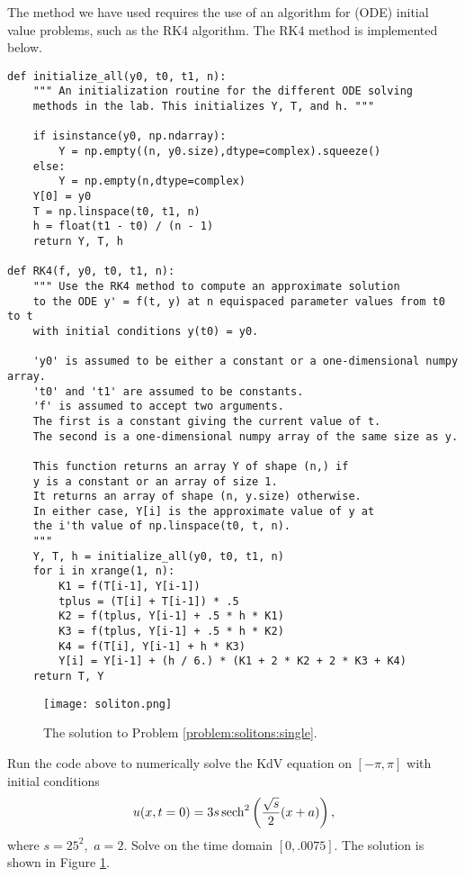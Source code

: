 The method we have used requires the use of an algorithm for (ODE) initial value problems, such as the RK4 algorithm.
The RK4 method is implemented below.
\begin{lstlisting}
def initialize_all(y0, t0, t1, n):
	""" An initialization routine for the different ODE solving
	methods in the lab. This initializes Y, T, and h. """
	
	if isinstance(y0, np.ndarray):
		Y = np.empty((n, y0.size),dtype=complex).squeeze()
	else:
		Y = np.empty(n,dtype=complex)
	Y[0] = y0
	T = np.linspace(t0, t1, n)
	h = float(t1 - t0) / (n - 1)
	return Y, T, h

def RK4(f, y0, t0, t1, n):
	""" Use the RK4 method to compute an approximate solution
	to the ODE y' = f(t, y) at n equispaced parameter values from t0 to t
	with initial conditions y(t0) = y0.
	
	'y0' is assumed to be either a constant or a one-dimensional numpy array.
	't0' and 't1' are assumed to be constants.
	'f' is assumed to accept two arguments.
	The first is a constant giving the current value of t.
	The second is a one-dimensional numpy array of the same size as y.
	
	This function returns an array Y of shape (n,) if
	y is a constant or an array of size 1.
	It returns an array of shape (n, y.size) otherwise.
	In either case, Y[i] is the approximate value of y at
	the i'th value of np.linspace(t0, t, n).
	"""
	Y, T, h = initialize_all(y0, t0, t1, n)
	for i in xrange(1, n):
		K1 = f(T[i-1], Y[i-1])
		tplus = (T[i] + T[i-1]) * .5
		K2 = f(tplus, Y[i-1] + .5 * h * K1)
		K3 = f(tplus, Y[i-1] + .5 * h * K2)
		K4 = f(T[i], Y[i-1] + h * K3)
		Y[i] = Y[i-1] + (h / 6.) * (K1 + 2 * K2 + 2 * K3 + K4)
	return T, Y
\end{lstlisting}

\begin{figure}
\centering
\texttt{[image: soliton.png]}
\caption{The solution to Problem \ref{problem:solitons:single}.}
\label{fig:solitons:single}
\end{figure}

\begin{problem}
Run the code above to numerically solve the KdV equation on $[-\pi,\pi]$ with initial conditions 
\[
u(x,t=0) = 3s\operatorname{sech}^2\left(\frac{\sqrt{s}}{2}(x+a)\right),
\]
where $s = 25^2,$ $a = 2$. Solve on the time domain $[0,.0075]$.
The solution is shown in Figure \ref{fig:solitons:single}.
\label{problem:solitons:single}
\end{problem}

